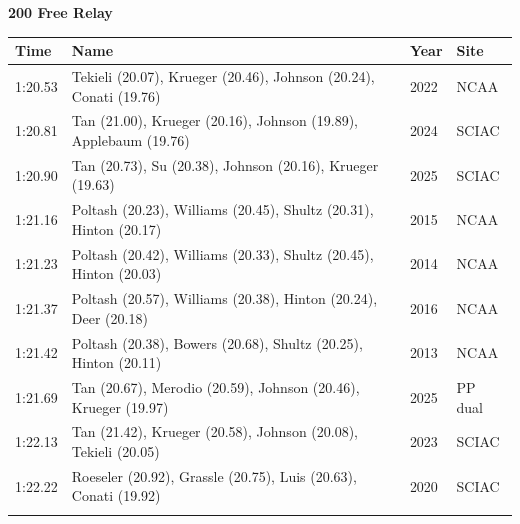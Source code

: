 \vspace{1.2em}
\noindent\begin{minipage}[t]{0.98\textwidth}
\centering
\textbf{\textcolor{teamprimary}{200 Free Relay}}\par
\vspace{0.5em}
\centering
\small
\renewcommand{\arraystretch}{1.0}
\setlength{\tabcolsep}{4pt}
\begin{tabular}{@{}p{2.7cm}p{4.3cm}p{1.6cm}p{2.7cm}@{}}
\toprule
\textbf{Time} & \textbf{Name} & \textbf{Year} & \textbf{Site} \\
\midrule
1:20.53 & Tekieli (20.07), Krueger (20.46), Johnson (20.24), Conati (19.76) & 2022 & NCAA \\
1:20.81 & Tan (21.00), Krueger (20.16), Johnson (19.89), Applebaum (19.76) & 2024 & SCIAC \\
1:20.90 & Tan (20.73), Su (20.38), Johnson (20.16), Krueger (19.63) & 2025 & SCIAC \\
1:21.16 & Poltash (20.23), Williams (20.45), Shultz (20.31), Hinton (20.17) & 2015 & NCAA \\
1:21.23 & Poltash (20.42), Williams (20.33), Shultz (20.45), Hinton (20.03) & 2014 & NCAA \\
1:21.37 & Poltash (20.57), Williams (20.38), Hinton (20.24), Deer (20.18) & 2016 & NCAA \\
1:21.42 & Poltash (20.38), Bowers (20.68), Shultz (20.25), Hinton (20.11) & 2013 & NCAA \\
1:21.69 & Tan (20.67), Merodio (20.59), Johnson (20.46), Krueger (19.97) & 2025 & PP dual \\
1:22.13 & Tan (21.42), Krueger (20.58), Johnson (20.08), Tekieli (20.05) & 2023 & SCIAC \\
1:22.22 & Roeseler (20.92), Grassle (20.75), Luis (20.63), Conati (19.92) & 2020 & SCIAC \\
\bottomrule
\vspace{0.5em}
\end{tabular}
\end{minipage}
\vspace{1.2em}
